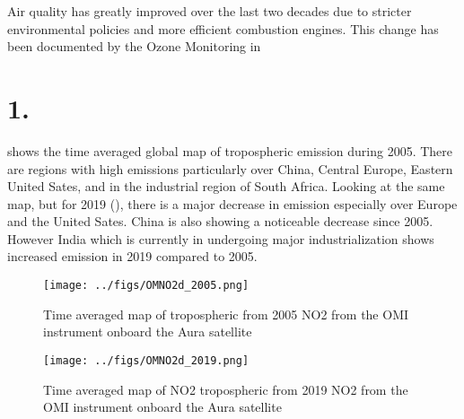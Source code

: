 Air quality has greatly improved over the last two decades due to stricter environmental
policies and more efficient combustion engines. This change has been documented by the 
Ozone Monitoring in  
\section*{1.} 
 shows the time averaged global map of tropospheric 
 emission during 2005. There are regions with high emissions particularly over 
China, Central Europe, Eastern United Sates, and in the industrial region of South Africa. 
Looking at the same map, but for 2019 (), there is a major 
decrease in  emission especially over Europe and the United Sates. China is also 
showing a noticeable decrease since 2005. However India which is currently in undergoing 
major industrialization shows increased  emission in 2019 compared to 2005.  
\begin{figure}
    \centering
        \texttt{[image: ../figs/OMNO2d\_2005.png]}
    \caption{Time averaged map of  tropospheric from 2005 NO2 from the OMI instrument
    onboard the Aura satellite   }
    \label{fig:OMI_global_2005NO2}
\end{figure}

\begin{figure}
    \centering
        \texttt{[image: ../figs/OMNO2d\_2019.png]}
    \caption{Time averaged map of NO2 tropospheric from 2019 NO2 from the OMI instrument  
    onboard the Aura satellite}
    \label{fig:OMI_global_2019NO2}
\end{figure}

